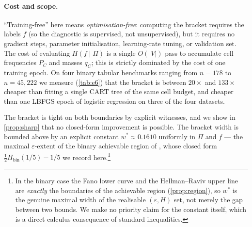 \documentclass[10pt]{article}
\theoremstyle{definition}
\theoremstyle{remark}
\newcommand{\Hbin}{H_{\mathrm{bin}}}
\newcommand{\eps}{\varepsilon}
\begin{document}
\paragraph{Cost and scope.} ``Training-free'' here means
\emph{optimisation-free}: computing the bracket requires the
labels $f$ (so the diagnostic is supervised, not unsupervised),
but it requires no gradient steps, parameter initialisation,
learning-rate tuning, or validation set. The cost of evaluating
$H(f \mid \Pi)$ is a single $O(|V|)$ pass to accumulate cell
frequencies $P_{C}$ and masses $q_{C}$; this is strictly
dominated by the cost of one training epoch. On four binary
tabular benchmarks ranging from $n = 178$ to $n = 45{,}222$ we
measure (\cref{tab:e6}) that the bracket is between $20\times$
and $133\times$ cheaper than fitting a single CART tree of the
same cell budget, and cheaper than one LBFGS epoch of logistic
regression on three of the four datasets.

The bracket is tight on both boundaries by explicit witnesses,
and we show in \cref{prop:sharp} that no closed-form improvement
is possible. The bracket width is bounded above by an explicit
constant $w^{*}\approx 0.1610$ uniformly in $\Pi$ and $f$ ---
the maximal $\eps$-extent of the binary achievable region of
\citet{feder1994}, whose closed form
$\tfrac{1}{2}\Hbin(1/5)-1/5$ we record here.\footnote{In the
binary case the Fano lower curve and the Hellman--Raviv upper
line are \emph{exactly} the boundaries of the achievable region
(\cref{prop:region}), so $w^{*}$ is the genuine maximal width
of the realisable $(\eps,H)$ set, not merely the gap between
two bounds. We make no priority claim for the constant itself,
which is a direct calculus consequence of standard inequalities.}
\end{document}
